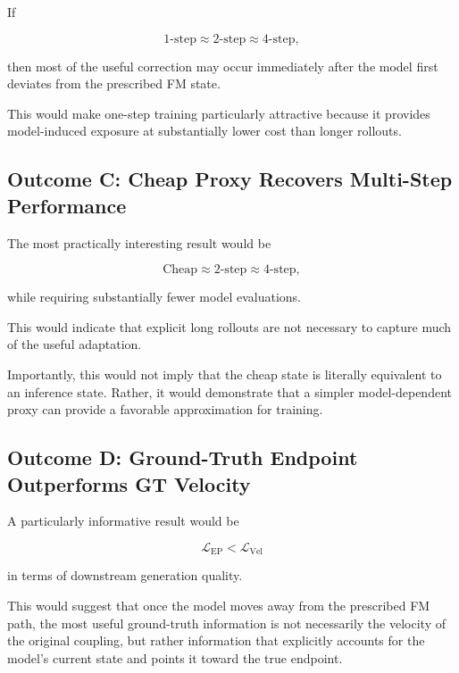 \documentclass[11pt]{article}
\begin{document}
If

\begin{equation}
\mathrm{1\text{-}step}
\approx
\mathrm{2\text{-}step}
\approx
\mathrm{4\text{-}step},
\end{equation}

then most of the useful correction may occur immediately after the model first
deviates from the prescribed FM state.

This would make one-step training particularly attractive because it provides
model-induced exposure at substantially lower cost than longer rollouts.

\subsection{Outcome C: Cheap Proxy Recovers Multi-Step Performance}

The most practically interesting result would be

\begin{equation}
\mathrm{Cheap}
\approx
\mathrm{2\text{-}step}
\approx
\mathrm{4\text{-}step},
\end{equation}

while requiring substantially fewer model evaluations.

This would indicate that explicit long rollouts are not necessary to capture
much of the useful adaptation.

Importantly, this would not imply that the cheap state is literally equivalent
to an inference state. Rather, it would demonstrate that a simpler
model-dependent proxy can provide a favorable approximation for training.

\subsection{Outcome D: Ground-Truth Endpoint Outperforms GT Velocity}

A particularly informative result would be

\begin{equation}
\mathcal{L}_{\mathrm{EP}}
<
\mathcal{L}_{\mathrm{Vel}}
\end{equation}

in terms of downstream generation quality.

This would suggest that once the model moves away from the prescribed FM path,
the most useful ground-truth information is not necessarily the velocity of the
original coupling, but rather information that explicitly accounts for the
model's current state and points it toward the true endpoint.
\end{document}
